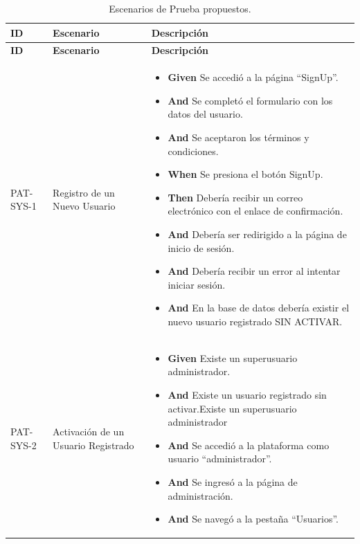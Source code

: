\begin{longtable}{|p{1cm}|p{2.5cm}|p{12cm}|}
    \caption{Escenarios de Prueba propuestos.}\\
    \hline
    \textbf{ID} & \textbf{Escenario} & \textbf{Descripción} \\
    \hline
    \endfirsthead
    
    \hline
    \textbf{ID} & \textbf{Escenario} & \textbf{Descripción} \\
    \hline
    \endhead
    
    PAT-SYS-1 & Registro de un Nuevo Usuario & 
        \begin{itemize}
            \item \textbf{Given} Se accedió a la página ``SignUp''.
            \item \textbf{And} Se completó el formulario con los datos del usuario.
            \item \textbf{And} Se aceptaron los términos y condiciones.
            \newline
            \item \textbf{When} Se presiona el botón SignUp.
            \newline
            \item \textbf{Then} Debería recibir un correo electrónico con el enlace de confirmación.
            \item \textbf{And} Debería ser redirigido a la página de inicio de sesión.
            \item \textbf{And} Debería recibir un error al intentar iniciar sesión.
            \item \textbf{And} En la base de datos debería existir el nuevo usuario registrado SIN ACTIVAR.
        \end{itemize} \\
    \hline
    PAT-SYS-2 & Activación de un Usuario Registrado & 
    \begin{itemize}
        \item \textbf{Given} Existe un superusuario administrador.
        \item \textbf{And} Existe un usuario registrado sin activar.Existe un superusuario administrador
        \item \textbf{And} Se accedió a la plataforma como usuario ``administrador''.
        \item \textbf{And} Se ingresó a la página de administración.
        \item \textbf{And} Se navegó a la pestaña ``Usuarios''.
        \newline

\end{itemize}
\end{longtable}
